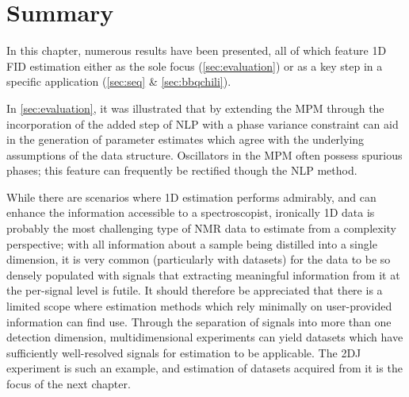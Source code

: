 \section{Summary}

In this chapter, numerous results have been presented, all of which feature
\ac{1D} \ac{FID} estimation either as the sole focus (\cref{sec:evaluation})
or as a key step in a specific application (\cref{sec:seq} \&
\cref{sec:bbqchili}).

In \cref{sec:evaluation}, it was illustrated that by extending the \ac{MPM} through the
incorporation of the added step of \ac{NLP} with a phase variance constraint can
aid in the generation of parameter estimates which agree with the underlying
assumptions of the data structure. Oscillators in the \ac{MPM} often possess
spurious phases; this feature can frequently be rectified though the \ac{NLP}
method.

While there are scenarios where \ac{1D} estimation performs admirably, and can
enhance the information accessible to a spectroscopist, ironically \ac{1D} data
is probably the most challenging type of \ac{NMR} data to estimate from a
complexity perspective; with all information about a sample being
distilled into a single dimension, it is very common (particularly with
 datasets) for the data to be so densely
populated with signals that extracting meaningful information from it at
the per-signal level is futile. It should therefore be appreciated that
there is a limited scope where estimation methods which rely minimally on
user-provided information can find use. Through the separation of signals into
more than one detection dimension, multidimensional experiments can yield
datasets which have sufficiently well-resolved signals for estimation to be
applicable. The \ac{2DJ} experiment is such an example, and estimation of
datasets acquired from it is the focus of the next chapter.
